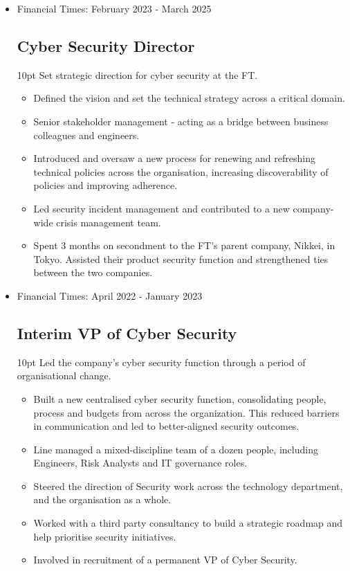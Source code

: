 \documentclass[a4paper]{article}
\newenvironment{detail}{\begin{adjustwidth}{10pt}{}}{\end{adjustwidth}}
\begin{document}
\begin{itemize}


\item Financial Times: February 2023 - March 2025
\subsection*{Cyber Security Director}
\begin{detail}
Set strategic direction for cyber security at the FT.

\begin{itemize}
	\item Defined the vision and set the technical strategy across a critical domain.
	\item Senior stakeholder management - acting as a bridge between business colleagues and engineers.
	\item Introduced and oversaw a new process for renewing and refreshing technical policies across the organisation, increasing discoverability of policies and improving adherence.
	\item Led security incident management and contributed to a new company-wide crisis management team.
	\item Spent 3 months on secondment to the FT's parent company, Nikkei, in Tokyo.  Assisted their product security function and strengthened ties between the two companies.
\end{itemize}
\end{detail}

\item Financial Times: April 2022 - January 2023
\subsection*{Interim VP of Cyber Security}
\begin{detail}
Led the company's cyber security function through a period of organisational change.

\begin{itemize}
	\item Built a new centralised cyber security function, consolidating people, process and budgets from across the organization.  This reduced barriers in communication and led to better-aligned security outcomes.
	\item Line managed a mixed-discipline team of a dozen people, including Engineers, Risk Analysts and IT governance roles.
	\item Steered the direction of Security work across the technology department, and the organisation as a whole.
	\item Worked with a third party consultancy to build a strategic roadmap and help prioritise security initiatives.
	\item Involved in recruitment of a permanent VP of Cyber Security.
\end{itemize}
\end{detail}


\end{itemize}
\end{document}
